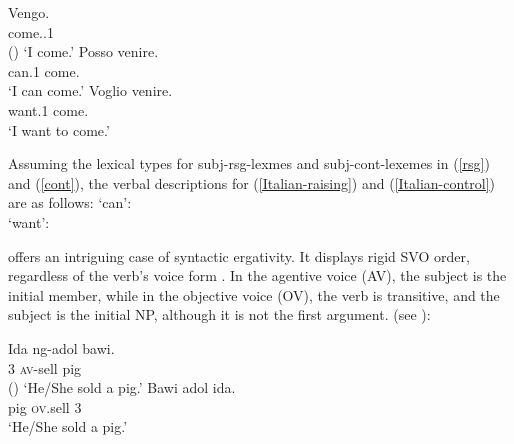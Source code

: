 \documentclass[output=paper
	        ,collection
	        ,collectionchapter
 	        ,biblatex
                ,babelshorthands
                ,newtxmath
                ,draftmode
                ,colorlinks, citecolor=brown
]{langscibook}
\begin{document}
\eal
\ex 
\label{Italian}
\gll Vengo.\\
     come.\PRS.1\SG\\\hfill()
\glt `I come.'
\ex 
\label{Italian-raising}
\gll Posso venire.\\
     can.1\SG{} come.\INF\\
\glt `I can come.'
\ex 
\label{Italian-control}
\gll Voglio venire.\\ 
     want.1\SG{} come.\INF\\
\glt `I want to come.'
\zl

Assuming the lexical types for subj-rsg-lexmes and subj-cont-lexemes in (\ref{rsg}) and
(\ref{cont}), the verbal descriptions for (\ref{Italian-raising}) and (\ref{Italian-control}) are as
follows:
\eal
\ex	
{} `can':\\
\label{rais1}
\ex 
{} `want':\\
\zl


 offers an intriguing case of syntactic ergativity. It displays rigid SVO order,
regardless of the verb's voice form \citep{WechslerandArka1998}. In the agentive voice (AV), the
subject is the \argst initial member, while in the objective voice (OV), the verb is transitive, and
the subject is the initial NP, although it is not the first argument.  (see
):

\eal
\ex  
\gll Ida ng-adol bawi.\\
     3\SG{} \textsc{av}-sell pig\\ \hfill()
\glt `He/She sold a pig.'
\ex 
\gll Bawi adol ida.\\
     pig \textsc{ov}.sell 3\SG \\
\glt `He/She sold a pig.' 
\zl
\end{document}
